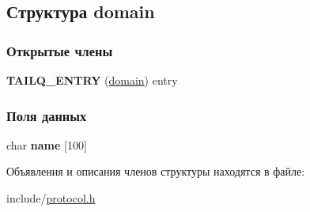 \hypertarget{structdomain}{\subsection{Структура domain}
\label{structdomain}
}
\subsubsection*{Открытые члены}
\begin{DoxyCompactItemize}
\item 
\hypertarget{structdomain_a3309208849efde1d9f01961919a9224a}{{\bfseries T\-A\-I\-L\-Q\-\_\-\-E\-N\-T\-R\-Y} (\hyperlink{structdomain}{domain}) entry}\label{structdomain_a3309208849efde1d9f01961919a9224a}

\end{DoxyCompactItemize}
\subsubsection*{Поля данных}
\begin{DoxyCompactItemize}
\item 
\hypertarget{structdomain_ace5129f894be01f6fd56b0131d9d6793}{char {\bfseries name} \mbox{[}100\mbox{]}}\label{structdomain_ace5129f894be01f6fd56b0131d9d6793}

\end{DoxyCompactItemize}


Объявления и описания членов структуры находятся в файле\-:\begin{DoxyCompactItemize}
\item 
include/\hyperlink{protocol_8h}{protocol.\-h}\end{DoxyCompactItemize}
